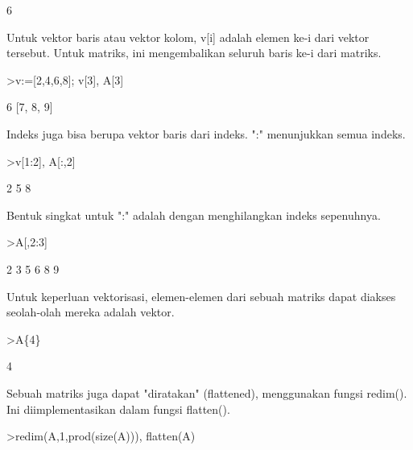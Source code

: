 \documentclass[12pt,arial,letterpaper]{book}
\begin{document}
\begin{eulercomment}
\begin{eulercomment}
\begin{eulercomment}
\begin{eulercomment}
\begin{eulercomment}
\begin{eulercomment}
\begin{euleroutput}
  6
\end{euleroutput}
\begin{eulercomment}
Untuk vektor baris atau vektor kolom, v[i] adalah elemen ke-i dari
vektor tersebut. Untuk matriks, ini mengembalikan seluruh baris ke-i
dari matriks.
\end{eulercomment}
\begin{eulerprompt}
>v:=[2,4,6,8]; v[3], A[3]
\end{eulerprompt}
\begin{euleroutput}
  6
  [7,  8,  9]
\end{euleroutput}
\begin{eulercomment}
Indeks juga bisa berupa vektor baris dari indeks. ":" menunjukkan
semua indeks.
\end{eulercomment}
\begin{eulerprompt}
>v[1:2], A[:,2]
\end{eulerprompt}
\begin{euleroutput}
  [2,  4]
              2 
              5 
              8 
\end{euleroutput}
\begin{eulercomment}
Bentuk singkat untuk ":" adalah dengan menghilangkan indeks
sepenuhnya.
\end{eulercomment}
\begin{eulerprompt}
>A[,2:3]
\end{eulerprompt}
\begin{euleroutput}
              2             3 
              5             6 
              8             9 
\end{euleroutput}
\begin{eulercomment}
Untuk keperluan vektorisasi, elemen-elemen dari sebuah matriks dapat
diakses seolah-olah mereka adalah vektor.
\end{eulercomment}
\begin{eulerprompt}
>A\{4\}
\end{eulerprompt}
\begin{euleroutput}
  4
\end{euleroutput}
\begin{eulercomment}
Sebuah matriks juga dapat "diratakan" (flattened), menggunakan fungsi
redim(). Ini diimplementasikan dalam fungsi flatten().
\end{eulercomment}
\begin{eulerprompt}
>redim(A,1,prod(size(A))), flatten(A)
\end{eulerprompt}
\begin{euleroutput}
  [1,  2,  3,  4,  5,  6,  7,  8,  9]

\end{euleroutput}
\end{eulercomment}
\end{eulercomment}
\end{eulercomment}
\end{eulercomment}
\end{eulercomment}
\end{eulercomment}
\end{document}
